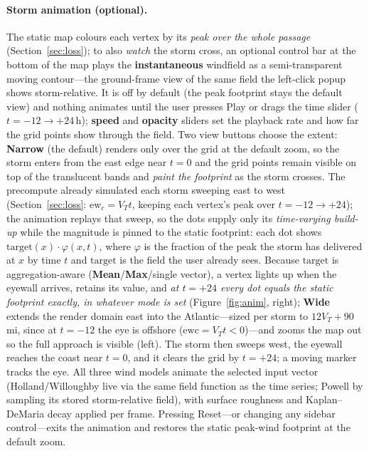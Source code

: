 \documentclass[11pt]{article}
\begin{document}
\paragraph{Storm animation (optional).}
The static map colours each vertex by its \emph{peak over the whole passage}
(Section~\ref{sec:loss}); to also \emph{watch} the storm cross, an optional control
bar at the bottom of the map plays the \textbf{instantaneous} windfield as a
semi-transparent moving contour---the ground-frame view of the same field the
left-click popup shows storm-relative. It is off by default (the peak footprint
stays the default view) and nothing animates until the user presses Play or drags
the time slider ($t=-12\to+24$\,h); \textbf{speed} and \textbf{opacity} sliders set
the playback rate and how far the grid points show through the field. Two view
buttons choose the extent: \textbf{Narrow} (the default) renders only over the grid
at the default zoom, so the storm enters from the east edge near $t=0$ and the grid
points remain visible on top of the translucent bands and \emph{paint the footprint}
as the storm crosses. The precompute already simulated each storm sweeping east to
west (Section~\ref{sec:loss}: $\mathrm{ew}_c=V_T t$, keeping each vertex's peak over
$t=-12\to+24$); the animation replays that sweep, so the dots supply only its
\emph{time-varying build-up} while the magnitude is pinned to the static footprint:
each dot shows $\text{target}(x)\cdot\varphi(x,t)$, where $\varphi$ is the fraction of
the peak the storm has delivered at $x$ by time $t$ and $\text{target}$ is the field
the user already sees. Because $\text{target}$ is aggregation-aware
(\textbf{Mean}/\textbf{Max}/single vector), a vertex lights up when the eyewall
arrives, retains its value, and \emph{at $t=+24$ every dot equals the static footprint
exactly, in whatever mode is set} (Figure~\ref{fig:anim}, right);
\textbf{Wide} extends the render domain east into the Atlantic---sized per storm to
$12V_T+90$\,mi, since at $t=-12$ the eye is offshore ($\mathrm{ewc}=V_T t<0$)---and
zooms the map out so the full approach is visible (left). The storm then sweeps west,
the eyewall reaches the coast near $t=0$, and it clears the grid by $t=+24$; a moving
marker tracks the eye. All three wind models animate the selected input vector
(Holland/Willoughby live via the same field function as the time series; Powell by
sampling its stored storm-relative field), with surface roughness and
Kaplan--DeMaria decay applied per frame. Pressing Reset---or changing any sidebar
control---exits the animation and restores the static peak-wind footprint at the
default zoom.
\end{document}
